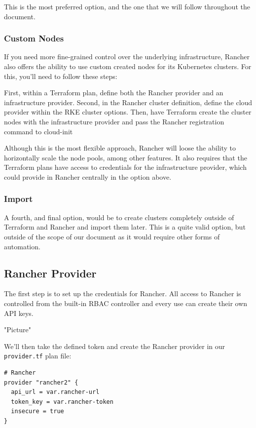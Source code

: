 This is the most preferred option, and the one that we will follow throughout the document.

\subsubsection{Custom Nodes}

If you need more fine-grained control over the underlying infrastructure, Rancher also offers the ability to use custom created nodes for its Kubernetes clusters. For this, you'll need to follow these steps:

First, within a  Terraform plan, define both the Rancher provider and an infrastructure provider. Second, in the Rancher cluster definition, define the cloud provider within the RKE cluster options. Then, have Terraform create the cluster nodes with the infrastructure provider and pass the Rancher registration command to cloud-init

Although this is the most flexible approach, Rancher will loose the ability to horizontally scale the node pools, among other features. It also requires that the Terraform plans have access to credentials for the infrastructure provider, which could provide in Rancher centrally in the option above.

\subsubsection{Import}

A fourth, and final option, would be to create clusters completely outside of Terraform and Rancher and import them later. This is a quite valid option, but outside of the scope of our document as it would require other forms of automation.

\subsection{Rancher Provider}

The first step is to set up the credentials for Rancher. All access to Rancher is controlled from the built-in RBAC controller and every use can create their own API keys.

"Picture"

We'll then take the defined token and create the Rancher provider in our \verb|provider.tf| plan file:

\begin{verbatim}
# Rancher
provider "rancher2" {
  api_url = var.rancher-url
  token_key = var.rancher-token
  insecure = true
}
\end{verbatim}

